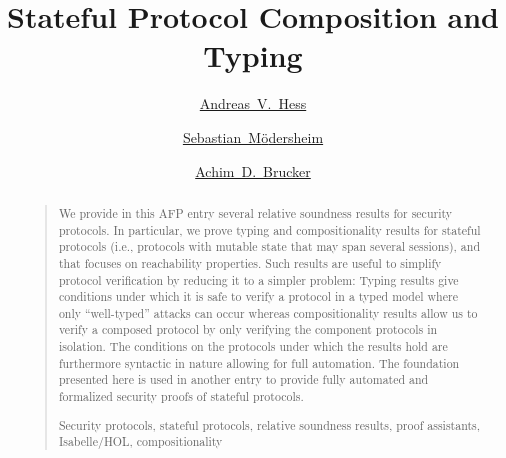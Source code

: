 \documentclass[10pt,DIV16,a4paper,abstract=true,twoside=semi,openright]
{scrreprt}
\title{Stateful Protocol Composition and Typing}
\author{%
   \href{https://www.dtu.dk/english/service/phonebook/person?id=64207}{Andreas~V.~Hess}\footnotemark[1]
   \and
   \href{https://people.compute.dtu.dk/samo/}{Sebastian~M{\"o}dersheim}\footnotemark[1]
   \and
   \href{http://www.brucker.ch/}{Achim~D.~Brucker}\footnotemark[2]
}
\begin{document}
  \maketitle
  \begin{abstract}
    \begin{quote}
        We provide in this AFP entry several relative soundness results for security protocols.
        In particular, we prove typing and compositionality results for stateful protocols (i.e., protocols with mutable state that may span several sessions), and that focuses on reachability properties.
        Such results are useful to simplify protocol verification by reducing it to a simpler problem: Typing results give conditions under which it is safe to verify a protocol in a typed model where only ``well-typed'' attacks can occur whereas compositionality results allow us to verify a composed protocol by only verifying the component protocols in isolation.
        The conditions on the protocols under which the results hold are furthermore syntactic in nature allowing for full automation.
        The foundation presented here is used in another entry to provide fully automated and formalized security proofs of stateful protocols.

    \bigskip
    Security protocols, stateful protocols, relative soundness results, proof assistants, Isabelle/HOL, compositionality
    \end{quote}
  \end{abstract}


\tableofcontents
\cleardoublepage
\end{document}
